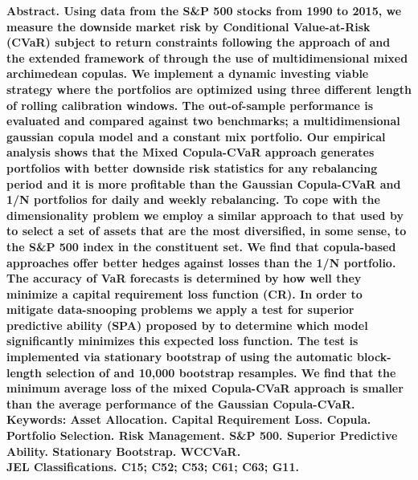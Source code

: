 \documentclass[a4paper,12pt]{report}
\begin{document}
\begin{refsection} 
\renewcommand{\thetable}{\arabic{table}}
\setlength{\baselineskip}{12pt}
\noindent\bf Abstract. \rm Using data from the S\&P 500 stocks from 1990 to 2015, we measure the
downside market risk by Conditional Value-at-Risk (CVaR) subject to return
constraints following the approach of \citet*{rockafellar2000,rockafellar2002%
} and the extended framework of \citet*{kakouris14} through the use of
multidimensional mixed archimedean copulas. We implement a dynamic investing
viable strategy where the portfolios are optimized using three different length of
rolling calibration windows. The out-of-sample performance is evaluated and
compared against two benchmarks; a multidimensional gaussian copula model and a
constant mix portfolio. Our empirical analysis shows that the Mixed Copula-CVaR
approach generates portfolios with better downside risk statistics for any rebalancing period and it is more profitable than the Gaussian Copula-CVaR and 1/N portfolios for daily and weekly rebalancing. To cope with the dimensionality problem we employ a similar approach to that used by \citet*{ggr06} to select a set of assets that are the most
diversified, in some sense, to the S\&P 500 index in the constituent set. We find that copula-based approaches offer better hedges against losses than the 1/N portfolio. The accuracy of VaR forecasts is determined by how well they minimize a capital requirement loss function (CR). In order to mitigate data-snooping problems we apply a test for superior predictive ability (SPA) proposed by  \citet*{hansen2005test} to determine which model significantly minimizes this expected loss function. The test is implemented via stationary bootstrap of \citet*{pr94} using the automatic block-length selection of \citet*{pw04} and 10,000 bootstrap resamples. We find that the minimum average loss of the mixed Copula-CVaR approach is smaller than the average performance of the Gaussian Copula-CVaR.
\\[.1in]




\noindent \bf Keywords: \rm Asset Allocation. Capital Requirement Loss. Copula. Portfolio
Selection. Risk Management. S\&P 500. Superior Predictive Ability. Stationary Bootstrap. WCCVaR.\\[.1in]
\noindent \bf JEL Classifications. \rm C15; C52; C53; C61; C63; G11.
\clearpage



\setlength{\baselineskip}{12pt}


\end{refsection}
\end{document}
